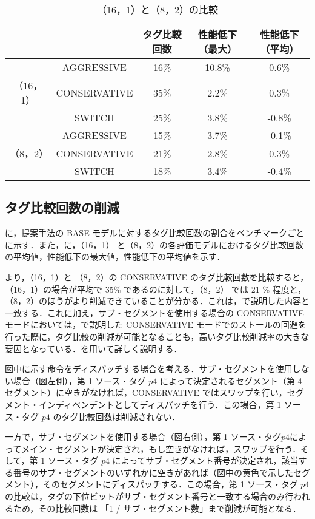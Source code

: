 \begin{table}[htb]
  \caption{（16，1）と（8，2）の比較}
  \footnotesize
  \center
    \begin{tabular}{cc|c|c|c} \hline \hline
     & & タグ比較回数 & 性能低下（最大） & 性能低下（平均）\\\hline
     & AGGRESSIVE  & 16\%  & 10.8\% & 0.6\% \\
    （16，1） & CONSERVATIVE & 35\% & 2.2\% & 0.3\% \\ \
     & SWITCH & 25\% & 3.8\% & -0.8\% \\ \hline
     & AGGRESSIVE & 15\% & 3.7\% & -0.1\% \\
    （8，2） & CONSERVATIVE & 21\% & 2.8\% & 0.3\% \\ 
     & SWITCH & 18\% & 3.4\% & -0.4\% \\ \hline
  \end{tabular}
  \label{tab:subseg_eval}
\end{table}

\subsection{タグ比較回数の削減}
に，提案手法の BASE モデルに対するタグ比較回数の割合をベンチマークごとに示す．また，に，（16，1） と（8，2）の各評価モデルにおけるタグ比較回数の平均値，性能低下の最大値，性能低下の平均値を示す．

 より，（16，1）と （8，2）の CONSERVATIVE のタグ比較回数を比較すると，（16，1）の場合が平均で 35\% であるのに対して，（8，2） では 21 \% 程度と，（8，2）のほうがより削減できていることが分かる．これは，で説明した内容と一致する．これに加え，サブ・セグメントを使用する場合の CONSERVATIVE モードにおいては，で説明した CONSERVATIVE モードでのストールの回避を行った際に，タグ比較の削減が可能となることも，高いタグ比較削減率の大きな要因となっている．を用いて詳しく説明する．

図中に示す命令をディスパッチする場合を考える．サブ・セグメントを使用しない場合（図左側），第 1 ソース・タグ $p4$ によって決定されるセグメント（第 4 セグメント）に空きがなければ，CONSERVATIVE ではスワップを行い，セグメント・インディペンデントとしてディスパッチを行う．この場合，第 1 ソース・タグ $p4$ のタグ比較回数は削減されない．

一方で，サブ・セグメントを使用する場合（図右側），第 1 ソース・タグ$p4$によってメイン・セグメントが決定され，もし空きがなければ，スワップを行う．そして，第 1 ソース・タグ $p4$ によってサブ・セグメント番号が決定され，該当する番号のサブ・セグメントのいずれかに空きがあれば（図中の黄色で示したセグメント），そのセグメントにディスパッチする．この場合，第 1 ソース・タグ $p4$ の比較は，タグの下位ビットがサブ・セグメント番号と一致する場合のみ行われるため，その比較回数は 「1 / サブ・セグメント数」まで削減が可能となる．

